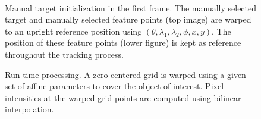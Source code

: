 								\begin{figure}[t]
								\centering
								\\
								\caption{Manual target initialization in the first frame.  The manually selected target and manually selected feature points (top image) are warped to an upright reference position using $(\theta, \lambda_1, \lambda_2, \phi, x, y)$.  The position of these feature points (lower figure) is kept as reference throughout the tracking process.}
								\label{Fig:affine_frame_1}
								\end{figure}

								\begin{figure}[t]
								\centering
								\caption{Run-time processing.  A zero-centered grid is warped using a given set of affine parameters to cover the object of interest.  Pixel intensities at the warped grid points are computed using bilinear interpolation.}
								\label{Fig:affine_runtime}
								\end{figure}

